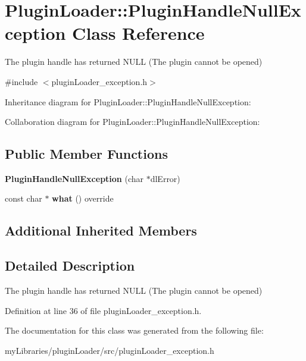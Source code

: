 \hypertarget{classPluginLoader_1_1PluginHandleNullException}{}\section{Plugin\+Loader\+::Plugin\+Handle\+Null\+Exception Class Reference}
\label{classPluginLoader_1_1PluginHandleNullException}


The plugin handle has returned N\+U\+LL (The plugin cannot be opened)  




{\ttfamily \#include $<$plugin\+Loader\+\_\+exception.\+h$>$}



Inheritance diagram for Plugin\+Loader\+::Plugin\+Handle\+Null\+Exception\+:


Collaboration diagram for Plugin\+Loader\+::Plugin\+Handle\+Null\+Exception\+:
\subsection*{Public Member Functions}
\begin{DoxyCompactItemize}
\item 
\mbox{\label{classPluginLoader_1_1PluginHandleNullException_a52efdc1dd5b024e785e884f54a4cdd8b}} 
{\bfseries Plugin\+Handle\+Null\+Exception} (char $\ast$dl\+Error)
\item 
\mbox{\label{classPluginLoader_1_1PluginHandleNullException_adc04d68d2d066403064e6b6e65b392f2}} 
const char $\ast$ {\bfseries what} () override
\end{DoxyCompactItemize}
\subsection*{Additional Inherited Members}


\subsection{Detailed Description}
The plugin handle has returned N\+U\+LL (The plugin cannot be opened) 

Definition at line 36 of file plugin\+Loader\+\_\+exception.\+h.



The documentation for this class was generated from the following file\+:\begin{DoxyCompactItemize}
\item 
my\+Libraries/plugin\+Loader/src/plugin\+Loader\+\_\+exception.\+h\end{DoxyCompactItemize}
